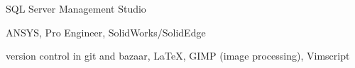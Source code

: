 \documentclass[]{deedy-resume-openfont}
\begin{document}
\begin{minipage}[t]{0.33\textwidth}
SQL Server Management Studio
\sectionsep

ANSYS, Pro Engineer, SolidWorks/SolidEdge
\sectionsep

version control in git and bazaar, \LaTeX, GIMP (image processing),
Vimscript




\sectionsep

%
%

\end{minipage}
\hfill
\end{document}
